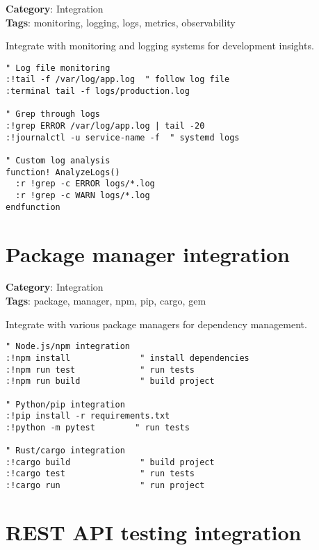 {{{{{\textbf{Category}: Integration\\ \textbf{Tags}: monitoring, logging, logs, metrics, observability
\vspace{0.5cm}

Integrate with monitoring and logging systems for development insights.

\begin{Exa*}{}
\begin{Verbatim}[fontsize=\footnotesize, breaklines, breakanywhere]
" Log file monitoring
:!tail -f /var/log/app.log  " follow log file
:terminal tail -f logs/production.log

" Grep through logs
:!grep ERROR /var/log/app.log | tail -20
:!journalctl -u service-name -f  " systemd logs

" Custom log analysis
function! AnalyzeLogs()
  :r !grep -c ERROR logs/*.log
  :r !grep -c WARN logs/*.log
endfunction
\end{Verbatim}
\end{Exa*}

\section{Package manager integration}

\textbf{Category}: Integration\\ \textbf{Tags}: package, manager, npm, pip, cargo, gem
\vspace{0.5cm}

Integrate with various package managers for dependency management.

\begin{Exa*}{}
\begin{Verbatim}[fontsize=\footnotesize, breaklines, breakanywhere]
" Node.js/npm integration
:!npm install              " install dependencies
:!npm run test             " run tests
:!npm run build            " build project

" Python/pip integration
:!pip install -r requirements.txt
:!python -m pytest        " run tests

" Rust/cargo integration
:!cargo build              " build project
:!cargo test               " run tests
:!cargo run                " run project
\end{Verbatim}
\end{Exa*}

\section{REST API testing integration}

}}}}}
